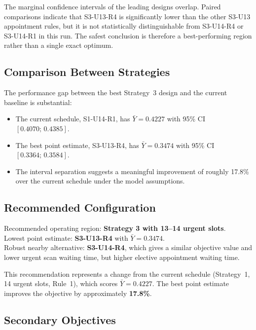 \documentclass[12pt, a4paper]{article}
\begin{document}
The marginal confidence intervals of the leading designs overlap. Paired comparisons indicate that S3-U13-R4 is significantly lower than the other S3-U13 appointment rules, but it is not statistically distinguishable from S3-U14-R4 or S3-U14-R1 in this run. The safest conclusion is therefore a best-performing region rather than a single exact optimum.

\subsection{Comparison Between Strategies}

The performance gap between the best Strategy~3 design and the current baseline is substantial:

\begin{itemize}
    \item The current schedule, S1-U14-R1, has $\bar{Y}=0.4227$ with 95\% CI $[0.4070;\,0.4385]$.
    \item The best point estimate, S3-U13-R4, has $\bar{Y}=0.3474$ with 95\% CI $[0.3364;\,0.3584]$.
    \item The interval separation suggests a meaningful improvement of roughly 17.8\% over the current schedule under the model assumptions.
\end{itemize}

\subsection{Recommended Configuration}

\begin{recbox}
Recommended operating region: \textbf{Strategy 3 with 13--14 urgent slots}. \\[4pt]
Lowest point estimate: \textbf{S3-U13-R4} with $\bar{Y}=0.3474$. \\[4pt]
Robust nearby alternative: \textbf{S3-U14-R4}, which gives a similar objective value and lower urgent scan waiting time, but higher elective appointment waiting time.
\end{recbox}

This recommendation represents a change from the current schedule (Strategy~1, 14 urgent slots, Rule~1), which scores $\bar{Y} = 0.4227$. The best point estimate improves the objective by approximately \textbf{17.8\%}.

\subsection{Secondary Objectives}
\end{document}
